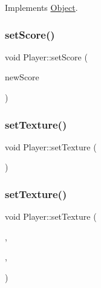 Implements \mbox{\hyperlink{class_object_ac5c796bfa75dedf6d3bfc74685b2b77d}{Object}}.

\mbox{\label{class_player_a8053d861a3d9d0f91fd7e35a38e7ce14}} 
\subsubsection{\texorpdfstring{setScore()}{setScore()}}
{\footnotesize\ttfamily void Player\+::set\+Score (\begin{DoxyParamCaption}\item[{const uint \&}]{new\+Score }\end{DoxyParamCaption})\hspace{0.3cm}{\ttfamily [inline]}}

\mbox{\label{class_player_a7f5f3ce419bc062ab59b6f689c24a5a6}} 
\subsubsection{\texorpdfstring{setTexture()}{setTexture()}\hspace{0.1cm}{\footnotesize\ttfamily [1/2]}}
{\footnotesize\ttfamily void Player\+::set\+Texture (\begin{DoxyParamCaption}\item[{std\+::shared\+\_\+ptr$<$ sf\+::\+Texture $>$}]{ }\end{DoxyParamCaption})}

\mbox{\label{class_player_a7d0ef1fb581ee3cc89f85c50c9c2c9ad}} 
\subsubsection{\texorpdfstring{setTexture()}{setTexture()}\hspace{0.1cm}{\footnotesize\ttfamily [2/2]}}
{\footnotesize\ttfamily void Player\+::set\+Texture (\begin{DoxyParamCaption}\item[{\mbox{\hyperlink{class_game_engine}{Game\+Engine}} $\ast$}]{,  }\item[{std\+::string}]{,  }\item[{sf\+::\+Int\+Rect}]{ }\end{DoxyParamCaption})}



